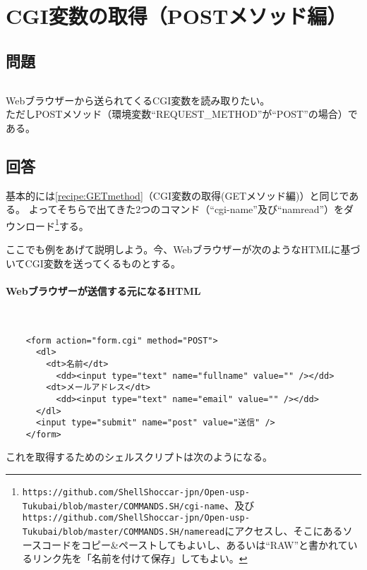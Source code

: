 \section{CGI変数の取得（POSTメソッド編）}
\label{recipe:POSTmethod}

\subsection*{問題}
\noindent
$\!\!\!\!\!$
\begin{grshfboxit}{160.0mm}
	Webブラウザーから送られてくるCGI変数を読み取りたい。\\
	ただしPOSTメソッド（環境変数``REQUEST\_{}METHOD''が``POST''の場合）である。
\end{grshfboxit}

\subsection*{回答}
基本的には\ref{recipe:GETmethod}（CGI変数の取得(GETメソッド編)）と同じである。
よってそちらで出てきた2つのコマンド（``cgi-name''及び``namread''）をダウンロード\footnote{\verb|https://github.com/ShellShoccar-jpn/Open-usp-Tukubai/blob/master/COMMANDS.SH/cgi-name|、及び \\ \verb|https://github.com/ShellShoccar-jpn/Open-usp-Tukubai/blob/master/COMMANDS.SH/nameread|にアクセスし、そこにあるソースコードをコピー\&{}ペーストしてもよいし、あるいは``RAW''と書かれているリンク先を「名前を付けて保存」してもよい。}する。

ここでも例をあげて説明しよう。今、Webブラウザーが次のようなHTMLに基づいてCGI変数を送ってくるものとする。
\paragraph{Webブラウザーが送信する元になるHTML} 　\\
\begin{frameboxit}{160.0mm}
\begin{verbatim}
	<form action="form.cgi" method="POST">
	  <dl>
	    <dt>名前</dt>
	      <dd><input type="text" name="fullname" value="" /></dd>
	    <dt>メールアドレス</dt>
	      <dd><input type="text" name="email" value="" /></dd>
	  </dl>
	  <input type="submit" name="post" value="送信" />
	</form>
\end{verbatim}
\end{frameboxit}

これを取得するためのシェルスクリプトは次のようになる。
